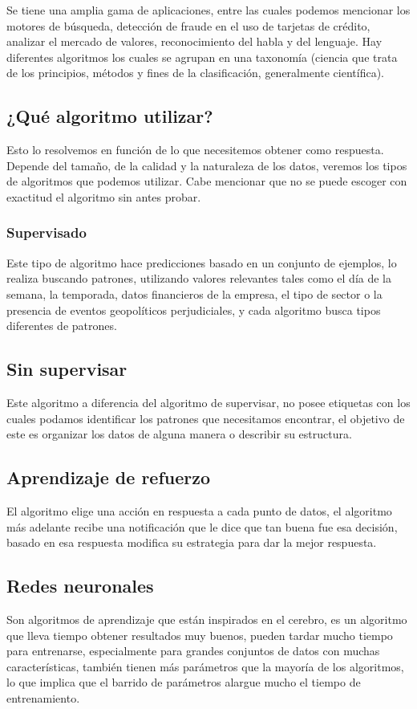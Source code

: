 \documentclass[a4paper,openright,11pt]{article}
\begin{document}
Se tiene una amplia gama de aplicaciones, entre las cuales podemos mencionar los motores de búsqueda, detección de fraude en el uso de tarjetas de crédito, analizar el mercado de valores, reconocimiento del habla y del lenguaje. Hay diferentes algoritmos los cuales se agrupan en una taxonomía (ciencia que trata de los principios, métodos y fines de la clasificación, generalmente científica).

\subsection{¿Qué algoritmo utilizar?}
Esto lo resolvemos en función de lo que necesitemos obtener como respuesta. Depende del tamaño, de la calidad y la naturaleza de los datos, veremos los tipos de algoritmos que podemos utilizar. Cabe mencionar que no se puede escoger con exactitud el algoritmo sin antes probar.

\subsubsection{Supervisado}
Este tipo de algoritmo hace predicciones basado en un conjunto de ejemplos, lo realiza buscando patrones, utilizando valores relevantes tales como el día de la semana, la temporada, datos financieros de la empresa, el tipo de sector o la presencia de eventos geopolíticos perjudiciales, y cada algoritmo busca tipos diferentes de patrones. 

\subsection{Sin supervisar}
Este algoritmo a diferencia del algoritmo de supervisar, no posee etiquetas con los cuales podamos identificar los patrones que necesitamos encontrar, el objetivo de este es organizar los datos de alguna manera o describir su estructura.

\subsection{Aprendizaje de refuerzo}
El algoritmo elige una acción en respuesta a cada punto de datos, el algoritmo más adelante recibe una notificación que le dice que tan buena fue esa decisión, basado en esa respuesta modifica su estrategia para dar la mejor respuesta. 

\subsection{Redes neuronales}
Son algoritmos de aprendizaje que están inspirados en el cerebro, es un algoritmo que lleva tiempo obtener resultados muy buenos,  pueden tardar mucho tiempo para entrenarse, especialmente para grandes conjuntos de datos con muchas características, también tienen más parámetros que la mayoría de los algoritmos, lo que implica que el barrido de parámetros alargue mucho el tiempo de entrenamiento. 


\pagestyle{fancy}
\end{document}
